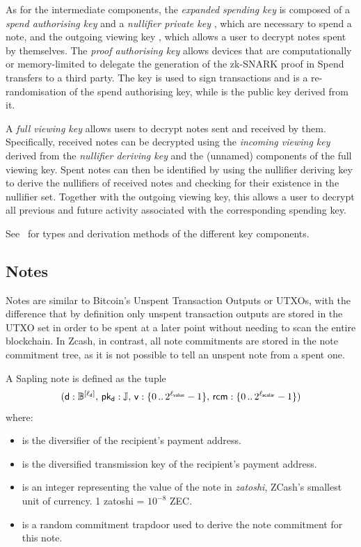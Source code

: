 As for the intermediate components, the \emph{expanded spending key} is composed of a \emph{spend authorising key} \ask and a \emph{nullifier private key} \nsk, which are necessary to spend a note, and the outgoing viewing key \ovk, which allows a user to decrypt notes spent by themselves.
The \emph{proof authorising key} allows devices that are computationally or memory-limited to delegate the generation of the zk-SNARK proof in Spend transfers to a third party.
The key \rsk is used to sign transactions and is a re-randomisation of the spend authorising key, while \rk is the public key derived from it.

A \emph{full viewing key} allows users to decrypt notes sent and received by them.
Specifically, received notes can be decrypted using the \emph{incoming viewing key} \ivk derived from the \emph{nullifier deriving key} \nk and the (unnamed) \ak components of the full viewing key.
Spent notes can then be identified by using the nullifier deriving key to derive the nullifiers of received notes and checking for their existence in the nullifier set.
Together with the outgoing viewing key, this allows a user to decrypt all previous and future activity associated with the corresponding spending key.

See~\cite[Section 4.2.2]{hopwood2016zcash} for types and derivation methods of the different key components.

\subsection{Notes}

Notes are similar to Bitcoin's Unspent Transaction Outputs or UTXOs, with the difference that by definition only unspent transaction outputs are stored in the UTXO set in order to be spent at a later point without needing to scan the entire blockchain.
In Zcash, in contrast, all note commitments are stored in the note commitment tree, as it is not possible to tell an unspent note from a spent one.

A Sapling note \n is defined as the tuple
\[
    (\mathsf{d} : \mathbb{B}^{[\ell_{\mathsf{d}}]},\, \mathsf{pk_d} : \mathbb{J} ,\, \mathsf{v} : \{0\,..\,2^{\ell_{\mathsf{value}}}-1\},\, \mathsf{rcm} : \{0\,..\,2^{\ell_{\mathsf{scalar}}}-1\})
\]
where:
\begin{itemize}
  \item \dvf is the diversifier of the recipient's payment address.
  \item \pkd is the diversified transmission key of the recipient's payment address.
  \item \val is an integer representing the value of the note in \emph{zatoshi}, ZCash's smallest unit of currency. 1 zatoshi = $10^{-8}$ ZEC.
  \item \rcm is a random commitment trapdoor used to derive the note commitment for this note.
\end{itemize}

